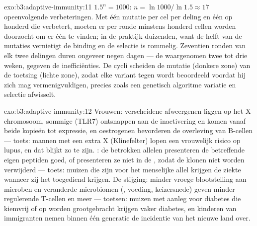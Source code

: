 \begin{solution}{exo:b3:adaptive-immunity:11}
$1.5^{n} = 1000$: $n = \ln 1000/\ln 1.5 \approx 17$ opeenvolgende
verbeteringen. Met één mutatie per cel per deling en één op honderd die
verbetert, moeten er per ronde minstens honderd cellen worden
doorzocht om er één te vinden; in de praktijk duizenden, want de helft
van de mutaties vernietigt de binding en de selectie is rommelig.
Zeventien ronden van elk twee delingen duren ongeveer negen dagen ---
de waargenomen twee tot drie weken, gegeven de inefficiënties. De cycli
scheiden de mutatie (donkere zone) van de toetsing (lichte zone), zodat
elke variant tegen  wordt beoordeeld voordat hij zich mag
vermenigvuldigen, precies zoals een genetisch algoritme variatie en
selectie afwisselt.
\end{solution}

\begin{solution}{exo:b3:adaptive-immunity:12}
Vrouwen: verscheidene afweergenen liggen op het X-chromosoom, sommige
(TLR7) ontsnappen aan de inactivering en komen vanaf beide kopieën tot
expressie, en oestrogenen bevorderen de overleving van B-cellen ---
toets: mannen met een extra X (Klinefelter) lopen een vrouwelijk risico
op lupus, en dat blijkt zo te zijn. : de betrokken allelen
presenteren de betreffende eigen peptiden goed, of presenteren ze niet
in de , zodat de klonen niet worden verwijderd --- toets: muizen
die  zijn voor het menselijke allel krijgen de ziekte wanneer
zij het  toegediend krijgen. De stijging: minder vroege
blootstelling aan microben en veranderde microbiomen (,
voeding, keizersnede) geven minder regulerende T-cellen en meer
 --- toetsen: muizen met aanleg voor diabetes die kiemvrij of
op  worden grootgebracht krijgen vaker diabetes, en kinderen
van immigranten nemen binnen één generatie de incidentie van het nieuwe
land over.
\end{solution}


